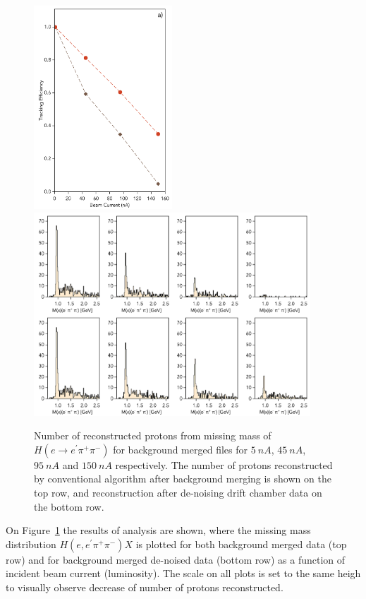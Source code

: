 \begin{figure}[!h]
\begin{center}
 \includegraphics[height=3.0in]{images/figure_phys_scan.pdf}
 \includegraphics[height=3.0in]{images/figure_phys_conv.pdf}
\caption {Number of reconstructed protons from missing mass of $H(e \rightarrow e^\prime \pi^+\pi^-)$ for background merged files for  $5~nA$, $45~nA$, $95~nA$ and $150~nA$ respectively. The number of protons reconstructed by conventional algorithm after background merging is shown on the top row, and reconstruction after  de-noising drift 
chamber data on the bottom row.}
 \label{physics::conv_dn}
 \end{center}
\end{figure}

On Figure~\ref{physics::conv_dn} the results of analysis are shown, where the missing mass distribution $H(e,e^\prime\pi^+\pi^-)X$ is plotted for both background merged data (top row) and for background merged de-noised data (bottom row) as a function of incident beam current (luminosity).  The scale on all plots is set to the same heigh to visually observe decrease of number of protons reconstructed. 

